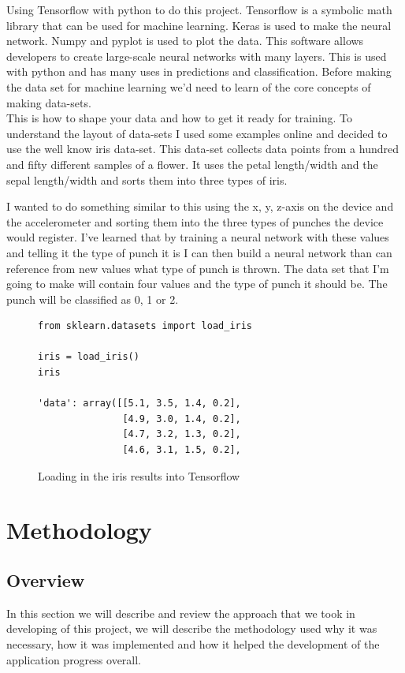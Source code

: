 \documentclass[a4paper,12pt]{report}
\begin{document}
Using Tensorflow with python to do this project. Tensorflow is a symbolic math library that can be used for machine learning. Keras is used to make the neural network. Numpy and pyplot is used to plot the data. This software allows developers to create large-scale neural networks with many layers. This is used with python and has many uses in predictions and classification. Before making the data set for machine learning we'd need to learn of the core concepts of making data-sets.\\This is how to shape your data and how to get it ready for training. To understand the layout of data-sets I used some examples online and decided to use the well know iris data-set. This data-set collects data points from a hundred and fifty different samples of a flower. It uses the petal length/width and the sepal length/width and sorts them into three types of iris.

I wanted to do something similar to this using the x,  y,  z-axis on the device and the accelerometer and sorting them into the three types of punches the device would register. I've learned that by training a neural network with these values and telling it the type of punch it is I can then build a neural network than can reference from new values what type of punch is thrown. The data set that I'm going to make will contain four values and the type of punch it should be. The punch will be classified as 0, 1 or 2.
\newline
\begin{figure}[h]
\begin{verbatim}
from sklearn.datasets import load_iris

iris = load_iris()
iris

'data': array([[5.1, 3.5, 1.4, 0.2],
               [4.9, 3.0, 1.4, 0.2],
               [4.7, 3.2, 1.3, 0.2],
               [4.6, 3.1, 1.5, 0.2],
\end{verbatim}
\caption{Loading in the iris results into Tensorflow}
\label{fig:iris}
\end{figure}

\chapter{Methodology}

\section{Overview}
In this section we will describe and review the approach that we took in developing of this project, we will describe the methodology used why it was necessary, how it was implemented and how it helped the development of the application progress overall.
\end{document}
